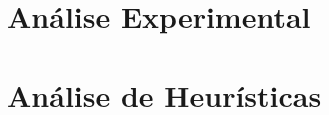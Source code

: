 \documentclass[12pt,a4paper]{article}
\begin{document}
\section*{Análise Experimental}



\section*{Análise de Heurísticas}
\end{document}
